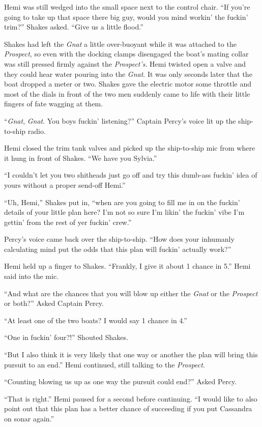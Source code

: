 \documentclass[
]{scrbook}
\begin{document}
Hemi was still wedged into the small space next to the control chair.
``If you're going to take up that space there big guy, would you mind
workin' the fuckin' trim?'' Shakes asked. ``Give us a little flood.''

Shakes had left the \emph{Gnat} a little over-buoyant while it was
attached to the \emph{Prospect}, so even with the docking clamps
disengaged the boat's mating collar was still pressed firmly against the
\emph{Prospect's}. Hemi twisted open a valve and they could hear water
pouring into the \emph{Gnat}. It was only seconds later that the boat
dropped a meter or two. Shakes gave the electric motor some throttle and
most of the dials in front of the two men suddenly came to life with
their little fingers of fate wagging at them.

``\emph{Gnat}, \emph{Gnat}. You boys fuckin' listening?'' Captain
Percy's voice lit up the ship-to-ship radio.

Hemi closed the trim tank valves and picked up the ship-to-ship mic from
where it hung in front of Shakes. ``We have you Sylvia.''

``I couldn't let you two shitheads just go off and try this dumb-ass
fuckin' idea of yours without a proper send-off Hemi.''

``Uh, Hemi,'' Shakes put in, ``when are you going to fill me in on the
fuckin' details of your little plan here? I'm not so sure I'm likin' the
fuckin' vibe I'm gettin' from the rest of yer fuckin' crew.''

Percy's voice came back over the ship-to-ship. ``How does your inhumanly
calculating mind put the odds that this plan will fuckin' actually
work?''

Hemi held up a finger to Shakes. ``Frankly, I give it about 1 chance in
5.'' Hemi said into the mic.

``And what are the chances that you will blow up either the \emph{Gnat}
or the \emph{Prospect} or both?'' Asked Captain Percy.

``At least one of the two boats? I would say 1 chance in 4.''

``One in fuckin' four?!'' Shouted Shakes.

``But I also think it is very likely that one way or another the plan
will bring this pursuit to an end.'' Hemi continued, still talking to
the \emph{Prospect}.

``Counting blowing us up as one way the pursuit could end?'' Asked
Percy.

``That is right.'' Hemi paused for a second before continuing. ``I would
like to also point out that this plan has a better chance of succeeding
if you put Cassandra on sonar again.''
\end{document}
